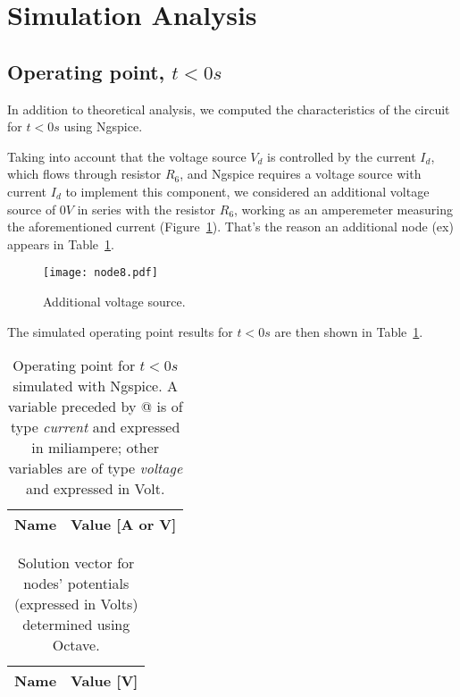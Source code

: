 \section{Simulation Analysis}
\label{sec:simulation}

\subsection{Operating point, $t<0s$} \label{subsec:op}

In addition to theoretical analysis, we computed the characteristics of the circuit for $t<0s$ using Ngspice.

Taking into account that the voltage source $V_d$ is controlled by the current $I_d$, which flows through resistor $R_6$, and Ngspice requires a voltage source with current $I_d$ to implement this component, we considered an additional voltage source of $0V$ in series with the resistor $R_6$, working as an amperemeter measuring the aforementioned current (Figure~\ref{fig:node8}). That's the reason an additional node (ex) appears in Table~\ref{tab:op11}.

\begin{figure}[H] \centering
\texttt{[image: node8.pdf]}
\caption{Additional voltage source.}
\label{fig:node8}
\end{figure}

The simulated operating point results for $t<0s$ are then shown in Table~\ref{tab:op11}.

\vspace{1mm}

\begin{minipage}[c]{0.5\linewidth}

\begin{table}[H]
  \centering
  \begin{tabular}{|l|r|}
    \hline    
    {\bf Name} & {\bf Value [A or V]} \\ \hline
    
  \end{tabular}
  \caption{Operating point for $t<0s$ simulated with Ngspice. A variable preceded by @ is of type {\em current}
    and expressed in miliampere; other variables are of type {\it voltage} and expressed in
    Volt.}
  \label{tab:op11}
\end{table}

\end{minipage}
\begin{minipage}[c]{0.5\linewidth}

\vspace{-4.5mm}

\begin{table}[H]
  \centering
  \begin{tabular}{|l|r|}
    \hline    
    {\bf Name} & {\bf Value [V]} \\ \hline
    
  \end{tabular}
  \caption{Solution vector for nodes' potentials (expressed in Volts) determined using Octave.}
  \label{tab:op12}
\end{table}

\end{minipage}

